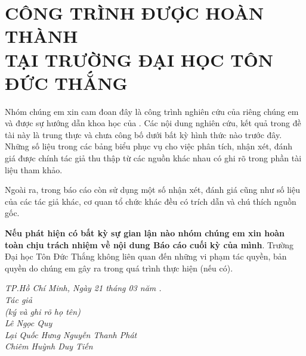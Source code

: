 \section*{ CÔNG TRÌNH ĐƯỢC HOÀN THÀNH\\TẠI TRƯỜNG ĐẠI HỌC TÔN ĐỨC THẮNG}

	Nhóm chúng em xin cam đoan đây là công trình nghiên cứu của riêng chúng em và được sự hướng dẫn khoa học của \gvhd. Các nội dung nghiên cứu, kết quả trong đề tài này là trung thực và chưa công bố dưới bất kỳ hình thức nào trước đây. Những số liệu trong các bảng biểu phục vụ cho việc phân tích, nhận xét, đánh giá được chính tác giả thu thập từ các nguồn khác nhau có ghi rõ trong phần tài liệu tham khảo.
 
	Ngoài ra, trong báo cáo còn sử dụng một số nhận xét, đánh giá cũng như số liệu của các tác giả khác, cơ quan tổ chức khác đều có trích dẫn và chú thích nguồn gốc.
 
	\textbf{Nếu phát hiện có bất kỳ sự gian lận nào nhóm chúng em xin hoàn toàn chịu trách nhiệm về nội dung Báo cáo cuối kỳ của mình}. Trường Đại học Tôn Đức Thắng không liên quan đến những vi phạm tác quyền, bản quyền do chúng em gây ra trong quá trình thực hiện (nếu có).
\begin{center}
    \textit{
         \hspace*{7cm}TP.Hồ Chí Minh, Ngày 21 tháng 03 năm \nam.\\
	\hspace*{7cm}Tác giả\\
	\hspace*{7cm}(ký và ghi rõ họ tên)\\
	\vspace*{0.2cm}
	\vspace*{1cm}
	\hspace*{7cm}Lê Ngọc Quy\\
        \vspace*{0.2cm}
	\vspace*{1cm}
        \hspace*{7cm}Lại Quốc Hưng 
    \vspace*{0.2cm}
	\vspace*{1cm}
    \hspace*{7cm}Nguyễn Thanh Phát\\
        \vspace*{0.2cm}
	\vspace*{1cm}
        \hspace*{7cm}Chiêm Huỳnh Duy Tiến
    }
	
\end{center}
\newpage
